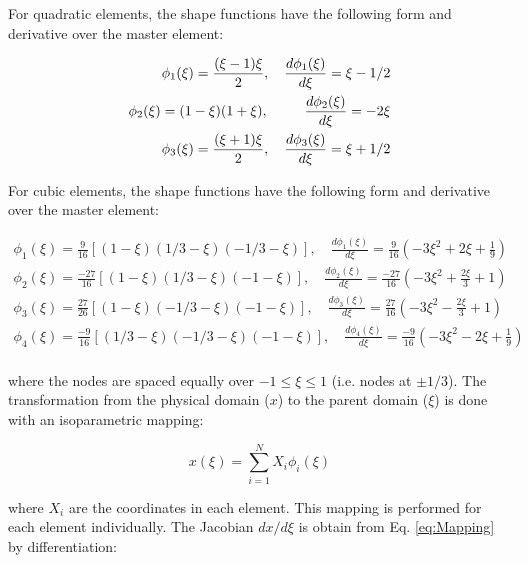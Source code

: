 \documentclass[10pt]{article}
\begin{document}
For quadratic elements, the shape functions have the following form and derivative over the master element:

\begin{equation}
\begin{aligned}
\phi_1(\xi)=\frac{(\xi-1)\xi}{2},\quad\frac{d\phi_1(\xi)}{d\xi}=\xi-1/2\\
\phi_2(\xi)=(1-\xi)(1+\xi), \hspace{0.9cm}\frac{d\phi_2(\xi)}{d\xi}=-2\xi\\
\phi_3(\xi)=\frac{(\xi+1)\xi}{2}, \quad\frac{d\phi_3(\xi)}{d\xi}=\xi+1/2\\
\end{aligned}
\end{equation}

For cubic elements, the shape functions have the following form and derivative over the master element:

\begin{equation}
\begin{aligned}
\phi_1(\xi)=\frac{9}{16}\left\lbrack(1-\xi)(1/3-\xi)(-1/3-\xi)\right\rbrack, \quad \frac{d\phi_1(\xi)}{d\xi}=\frac{9}{16}\left(-3\xi^2+2\xi+\frac{1}{9}\right)\\
\phi_2(\xi)=\frac{-27}{16}\left\lbrack(1-\xi)(1/3-\xi)(-1-\xi)\right\rbrack, \quad \frac{d\phi_2(\xi)}{d\xi}=\frac{-27}{16}\left(-3\xi^2+\frac{2\xi}{3}+1\right)\\
\phi_3(\xi)=\frac{27}{26}\left\lbrack(1-\xi)(-1/3-\xi)(-1-\xi)\right\rbrack, \quad \frac{d\phi_3(\xi)}{d\xi}=\frac{27}{16}\left(-3\xi^2-\frac{2\xi}{3}+1\right)\\
\phi_4(\xi)=\frac{-9}{16}\left\lbrack(1/3-\xi)(-1/3-\xi)(-1-\xi)\right\rbrack, \quad \frac{d\phi_4(\xi)}{d\xi}=\frac{-9}{16}\left(-3\xi^2-2\xi+\frac{1}{9}\right)\\
\end{aligned}
\end{equation}

where the nodes are spaced equally over \(-1\leq\xi\leq1\) (i.e. nodes at \(\pm 1/3\)). The transformation from the physical domain (\(x\)) to the parent domain (\(\xi\)) is done with an isoparametric mapping:

\begin{equation}
\label{eq:Mapping}
x(\xi)=\sum_{i=1}^{N} X_i\phi_i(\xi)
\end{equation}

where \(X_i\) are the coordinates in each element. This mapping is performed for each element individually. The Jacobian \(dx/d\xi\) is obtain from Eq. \eqref{eq:Mapping} by differentiation:
\end{document}
